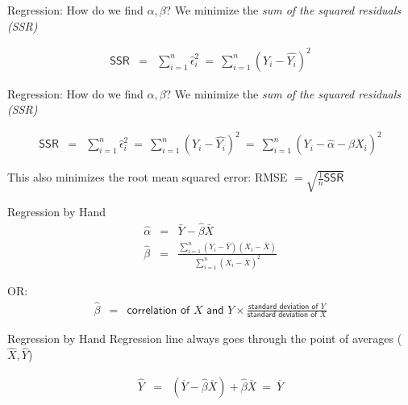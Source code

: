 \documentclass[presentation]{beamer}
\begin{document}
\begin{frame}[label={sec:orgf721f77}]{Regression: How do we find \(\alpha, \beta\)?}
\alert{We minimize the \emph{sum of the squared residuals (SSR)}}

\begin{eqnarray*}
\textsf{SSR} & = & \sum_{i=1}^n \hat\epsilon_i^2
              \ = \ \sum_{i=1}^n (Y_i - \widehat{Y_{i}})^2
\end{eqnarray*}
\end{frame}

\begin{frame}[label={sec:org0750668}]{Regression: How do we find \(\alpha, \beta\)?}
\alert{We minimize the \emph{sum of the squared residuals (SSR)}}

\begin{eqnarray*}
\textsf{SSR} & = & \sum_{i=1}^n \hat\epsilon_i^2
              \ = \ \sum_{i=1}^n (Y_i - \widehat{Y_{i}})^2
              \ = \  \sum_{i=1}^n (Y_i - \hat\alpha - \hat\beta X_i)^2
\end{eqnarray*}

\pause

This also minimizes the root mean squared error: RMSE \(= \sqrt{\frac{1}{n}\textsf{SSR}}\)
\end{frame}

\begin{frame}[label={sec:orgbda93af}]{Regression by Hand}
\begin{eqnarray*}
  \hat\alpha & = & \bar{Y} - \hat\beta \bar{X} \\
  \hat\beta & = & \frac{\sum_{i=1}^n (Y_i - \overline{Y})(X_i - \overline{X})}{\sum_{i=1}^n (X_i - \overline{X})^2}
    \end{eqnarray*}

OR:
\pause
\begin{eqnarray*}
      \hat\beta & = & \textsf{correlation of $X$ and $Y$} \times
                      \frac{\textsf{standard deviation of $Y$}}{\textsf{standard
                      deviation of $X$}}
    \end{eqnarray*}
\end{frame}


\begin{frame}[label={sec:org4f2aad5}]{Regression by Hand}
Regression line always goes through the point of averages (\(\hat{X},\hat{Y}\))

\begin{eqnarray*}
   \widehat{Y}  & = & (\overline{Y} - \hat\beta \overline{X}) + \hat\beta \overline{X} \ =
                    \ \overline{Y}
\end{eqnarray*}
\end{frame}
\end{document}
